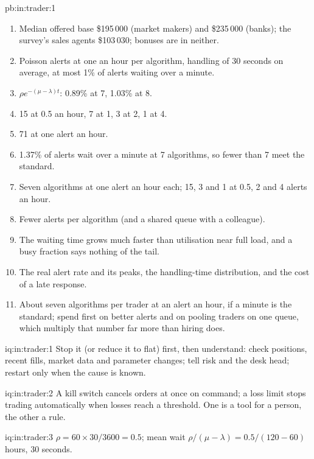 \begin{solution}{pb:in:trader:1}
\begin{enumerate}
reconciliation and review.
\item Median offered base \$195\,000 (market makers) and \$235\,000 (banks); the survey's sales agents \$103\,030; bonuses are
in neither.
\item Poisson alerts at one an hour per algorithm, handling of 30 seconds on average, at most 1\% of alerts waiting over a
minute.
\item $\rho e^{-(\mu-\lambda)t}$: 0.89\% at 7, 1.03\% at 8.
\item 15 at 0.5 an hour, 7 at 1, 3 at 2, 1 at 4.
\item 71 at one alert an hour.
\item 1.37\% of alerts wait over a minute at 7 algorithms, so fewer than 7 meet the standard.
\item Seven algorithms at one alert an hour each; 15, 3 and 1 at 0.5, 2 and 4 alerts an hour.
\item Fewer alerts per algorithm (and a shared queue with a colleague).
\item The waiting time grows much faster than utilisation near full load, and a busy fraction says nothing of the tail.
\item The real alert rate and its peaks, the handling-time distribution, and the cost of a late response.
\item About seven algorithms per trader at an alert an hour, if a minute is the standard; spend first on better alerts and on
pooling traders on one queue, which multiply that number far more than hiring does.
\end{enumerate}
\end{solution}

\begin{solution}{iq:in:trader:1}
Stop it (or reduce it to flat) first, then understand: check positions, recent fills, market data and parameter changes;
tell risk and the desk head; restart only when the cause is known.
\end{solution}

\begin{solution}{iq:in:trader:2}
A kill switch cancels orders at once on command; a loss limit stops trading automatically when losses reach a threshold.
One is a tool for a person, the other a rule.
\end{solution}

\begin{solution}{iq:in:trader:3}
$\rho=60\times30/3600=0.5$; mean wait $\rho/(\mu-\lambda)=0.5/(120-60)$ hours, 30 seconds.
\end{solution}

